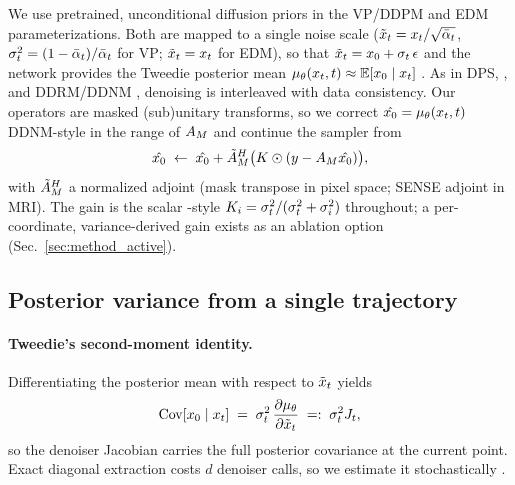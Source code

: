 We use pretrained, unconditional diffusion priors in the VP/DDPM
\cite{ho2020ddpm,song2021ddim} and EDM \cite{karras2022edm}
parameterizations. Both are mapped to a single noise scale
($\tilde{x}_t = x_t/\sqrt{\bar{\alpha}_t}$, $\sigma_t^2 = (1-\bar{\alpha}_t)/\bar{\alpha}_t$ for VP;
$\tilde{x}_t = x_t$ for EDM), so that $\tilde{x}_t = x_0 + \sigma_t\,\epsilon$ and
the network provides the Tweedie posterior mean
$\mu_\theta(x_t, t) \approx \mathbb{E}[x_0 \mid x_t]$
\cite{robbins1956empirical,efron2011tweedie}. As in DPS, \pigdm{}, and
DDRM/DDNM \cite{chung2023dps,song2023pigdm,kawar2022ddrm,wang2023ddnm},
denoising is interleaved with data consistency. Our operators are masked
(sub)unitary transforms, so we correct $\hat{x_0} = \mu_\theta(x_t,t)$
DDNM-style in the range of $A_M$ and continue the sampler from
\begin{equation}
  \hat{x_0} \;\leftarrow\; \hat{x_0} + \tilde{A}_M^{H}\big( K \odot (y - A_M \hat{x_0}) \big),
  \label{eq:dc}
\end{equation}
with $\tilde{A}_M^{H}$ a normalized adjoint (mask transpose in pixel
space; SENSE adjoint in MRI). The gain is the scalar \pigdm-style
$K_i = \sigma_t^2/(\sigma_t^2 + \sigma_i^2)$ \cite{song2023pigdm}
throughout; a per-coordinate, variance-derived gain exists as an
ablation option (Sec.~\ref{sec:method_active}).

\subsection{Posterior variance from a single trajectory}\label{sec:method_pv}

\paragraph{Tweedie's second-moment identity.}
Differentiating the posterior mean with respect to $\tilde{x}_t$ yields
\cite{efron2011tweedie,manor2024posterior}
\begin{equation}
  \operatorname{Cov}[x_0 \mid x_t] \;=\; \sigma_t^2 \, \frac{\partial \mu_\theta}{\partial \tilde{x}_t}
  \;=:\; \sigma_t^2 J_t ,
  \label{eq:tweedie2}
\end{equation}
so the denoiser Jacobian carries the full posterior covariance at the
current point. Exact diagonal extraction costs $d$ denoiser calls, so we
estimate it stochastically
\cite{hutchinson1990trace,boys2024tmpd,schioppa2026covaware}.

